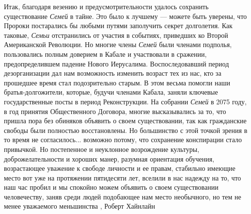 Итак, благодаря везению и предусмотрительности удалось сохранить существование
\emph{Семей} в тайне. Это было к лучшему — можете быть уверены, что Пророки
постарались бы любыми путями заполучить секрет долголетия.  Как таковые,
\emph{Семьи} отстранились от участия в событиях, приведших ко Второй
Американской Революции. Но многие члены \emph{Семей} были членами подполья,
пользовались полным доверием в Кабале и участвовали в сражении,
предопределившем падение Нового Иерусалима. Воспоследовавший период
дезорганизации дал нам возможность изменить возраст тех из нас, кто за
прошедшее время стал подозрительно старым. В этом весьма помогли наши
братья-долгожители, которые, будучи членами Кабала, заняли ключевые
государственные посты в период Реконструкции.  На собрании \emph{Семей} в 2075
году, в год принятия Общественного Договора, многие высказывались за то, что
пришла пора без обиняков объявить о своем существовании, так как гражданские
свободы были полностью восстановлены. Но большинство с этой точкой зрения в то
время не согласилось... возможно потому, что сохранение конспирации стало
привычкой. Но постепенное и неуклонное возрождение культуры, доброжелательности
и хороших манер, разумная ориентация обучения, возрастающее уважение к свободе
личности и ее правам, стабильно имеющие место вот уже на протяжении пятидесяти
лет, вселили в нас надежду на то, что наш час пробил и мы спокойно можем
объявить о своем существовании человечеству, заняв среди людей подобающее нам
место необычного, но тем не менее уважаемого меньшинства
, Роберт Хайнлайн
